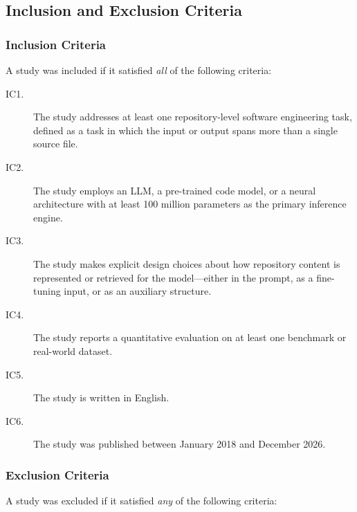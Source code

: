 \subsection{Inclusion and Exclusion Criteria}
\label{subsec:criteria}

\subsubsection{Inclusion Criteria}

A study was included if it satisfied \emph{all} of the following criteria:

\begin{description}
  \item[IC1.] The study addresses at least one repository-level software engineering task,
    defined as a task in which the input or output spans more than a single source file.
  \item[IC2.] The study employs an LLM, a pre-trained code model, or a neural architecture
    with at least 100 million parameters as the primary inference engine.
  \item[IC3.] The study makes explicit design choices about how repository content is
    represented or retrieved for the model---either in the prompt, as a fine-tuning input,
    or as an auxiliary structure.
  \item[IC4.] The study reports a quantitative evaluation on at least one benchmark or
    real-world dataset.
  \item[IC5.] The study is written in English.
  \item[IC6.] The study was published between January 2018 and December 2026.
\end{description}

\subsubsection{Exclusion Criteria}

A study was excluded if it satisfied \emph{any} of the following criteria:

